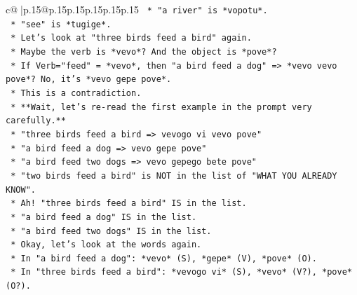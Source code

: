 \documentclass{article}
\begin{document}
{\begin{supertabular}{c@{$\;$}|p{.15\linewidth}@{}p{.15\linewidth}p{.15\linewidth}p{.15\linewidth}p{.15\linewidth}p{.15\linewidth}}
{{{\texttt{                                                    *   "a river" is *vopotu*.} \\
\texttt{                                                    *   "see" is *tugige*.} \\
\texttt{                                                *   Let's look at "three birds feed a bird" again.} \\
\texttt{                                                    *   Maybe the verb is *vevo*? And the object is *pove*?} \\
\texttt{                                                    *   If Verb="feed" = *vevo*, then "a bird feed a dog" => *vevo vevo pove*? No, it's *vevo gepe pove*.} \\
\texttt{                                                    *   This is a contradiction.} \\
\texttt{                                                    *   **Wait, let's re{-}read the first example in the prompt very carefully.**} \\
\texttt{                                                    *   "three birds feed a bird => vevogo vi vevo pove"} \\
\texttt{                                                    *   "a bird feed a dog => vevo gepe pove"} \\
\texttt{                                                    *   "a bird feed two dogs => vevo gepego bete pove"} \\
\texttt{                                                    *   "two birds feed a bird" is NOT in the list of "WHAT YOU ALREADY KNOW".} \\
\texttt{                                                    *   Ah! "three birds feed a bird" IS in the list.} \\
\texttt{                                                    *   "a bird feed a dog" IS in the list.} \\
\texttt{                                                    *   "a bird feed two dogs" IS in the list.} \\
\texttt{                                                    *   Okay, let's look at the words again.} \\
\texttt{                                                    *   In "a bird feed a dog": *vevo* (S), *gepe* (V), *pove* (O).} \\
\texttt{                                                    *   In "three birds feed a bird": *vevogo vi* (S), *vevo* (V?), *pove* (O?).} \\
}}}
\end{supertabular}}
\end{document}
